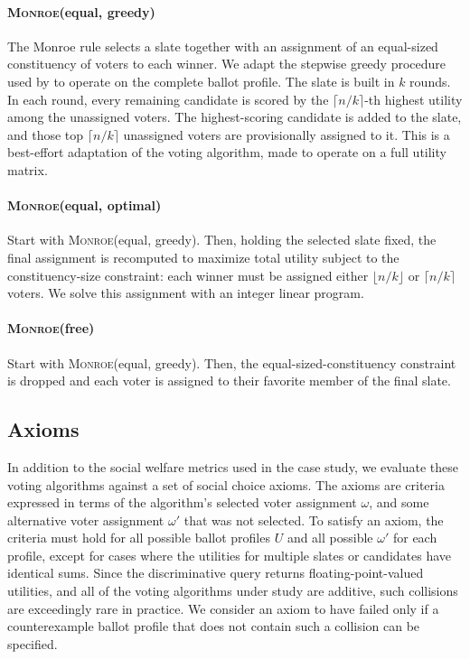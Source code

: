 \documentclass[11pt]{article}
\newcommand{\Monroe}{\textsc{Monroe}}
\begin{document}
\paragraph{\Monroe(equal, greedy) \citep{skowron-2015}}
The Monroe rule selects a slate together with an assignment of an equal-sized constituency of voters to each winner. We adapt the stepwise greedy procedure used by \citet{fish-v2} to operate on the complete ballot profile. The slate is built in \(k\) rounds. In each round, every remaining candidate is scored by the \(\lceil n/k\rceil\)-th highest utility among the unassigned voters. The highest-scoring candidate is added to the slate, and those top \(\lceil n/k\rceil\) unassigned voters are provisionally assigned to it. This is a best-effort adaptation of the \citet{fish-v2} voting algorithm, made to operate on a full utility matrix.

\paragraph{\Monroe(equal, optimal)}
Start with \Monroe(equal, greedy). Then, holding the selected slate fixed, the final assignment is recomputed to maximize total utility subject to the constituency-size constraint: each winner must be assigned either \(\lfloor n/k\rfloor\) or \(\lceil n/k\rceil\) voters. We solve this assignment with an integer linear program.

\paragraph{\Monroe(free)}
Start with \Monroe(equal, greedy). Then, the equal-sized-constituency constraint is dropped and each voter is assigned to their favorite member of the final slate.

\subsection{Axioms}
\label{sec:axioms}

In addition to the social welfare metrics used in the case study, we evaluate these voting algorithms against a set of social choice axioms. The axioms are criteria expressed in terms of the algorithm's selected voter assignment $\omega$, and some alternative voter assignment $\omega'$ that was not selected. To satisfy an axiom, the criteria must hold for all possible ballot profiles $U$ and all possible $\omega'$ for each profile, except for cases where the utilities for multiple slates or candidates have identical sums. Since the discriminative query returns floating-point-valued utilities, and all of the voting algorithms under study are additive, such collisions are exceedingly rare in practice. We consider an axiom to have failed only if a counterexample ballot profile that does not contain such a collision can be specified.
\end{document}
